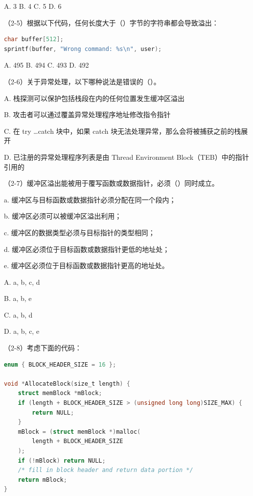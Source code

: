 \documentclass[UTF8]{ctexart}
\begin{document}
\noindent
A. 3 \quad
B. 4 \quad
C. 5 \quad
D. 6


\noindent
（2-5）根据以下代码，任何长度大于（\quad）字节的字符串都会导致溢出：

\begin{lstlisting}[language=C]
char buffer[512];
sprintf(buffer, "Wrong command: %s\n", user);
\end{lstlisting}

\noindent
A. 495 \quad
B. 494 \quad
C. 493 \quad
D. 492


\noindent
（2-6）关于异常处理，以下哪种说法是错误的（\quad）。

\noindent
A. 栈探测可以保护包括栈段在内的任何位置发生缓冲区溢出

\noindent
B. 攻击者可以通过覆盖异常处理程序地址修改指令指针

\noindent
C. 在 try \ldots catch 块中，如果 catch 块无法处理异常，那么会将被捕获之前的栈展开

\noindent
D. 已注册的异常处理程序列表是由 Thread Environment Block（TEB）中的指针引用的


\noindent
（2-7）缓冲区溢出能被用于覆写函数或数据指针，必须（\quad）同时成立。

\noindent
a. 缓冲区与目标函数或数据指针必须分配在同一个段内；

\noindent
b. 缓冲区必须可以被缓冲区溢出利用；

\noindent
c. 缓冲区的数据类型必须与目标指针的类型相同；

\noindent
d. 缓冲区必须位于目标函数或数据指针更低的地址处；

\noindent
e. 缓冲区必须位于目标函数或数据指针更高的地址处。


\noindent
A. a, b, c, d

\noindent
B. a, b, e

\noindent
C. a, b, d

\noindent
D. a, b, c, e

\noindent
（2-8）考虑下面的代码：

\begin{lstlisting}[language=C]
enum { BLOCK_HEADER_SIZE = 16 };

void *AllocateBlock(size_t length) {
    struct memBlock *mBlock;
    if (length + BLOCK_HEADER_SIZE > (unsigned long long)SIZE_MAX) {
        return NULL;
    }
    mBlock = (struct memBlock *)malloc(
        length + BLOCK_HEADER_SIZE
    );
    if (!mBlock) return NULL;
    /* fill in block header and return data portion */
    return mBlock;
}
\end{lstlisting}
\end{document}
